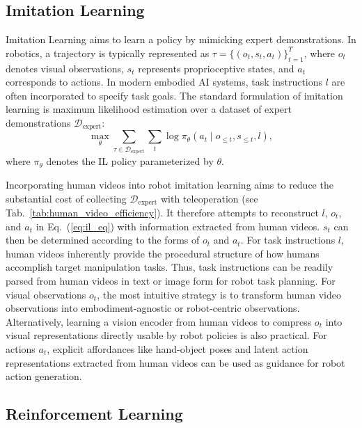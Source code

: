 \documentclass[Afour,sageh,times]{sagej}
\begin{document}
\subsection{Imitation Learning}

Imitation Learning aims to learn a policy by mimicking expert demonstrations. In robotics, a trajectory is typically represented as $\tau = \{(o_t, s_t, a_t)\}_{t=1}^T$, where $o_t$ denotes visual observations, $s_t$ represents proprioceptive states, and $a_t$ corresponds to actions. In modern embodied AI systems, task instructions $l$ are often incorporated to specify task goals. The standard formulation of imitation learning is maximum likelihood estimation over a dataset of expert demonstrations $\mathcal{D}_{\text{expert}}$:
\begin{equation}
\max_{\theta} \sum_{\tau \in \mathcal{D}_{\text{expert}}} \sum_{t} 
\log \pi_{\theta}(a_t \mid o_{\leq t}, s_{\leq t}, l),
\label{eq:il_eq}
\end{equation}
where $\pi_{\theta}$ denotes the IL policy parameterized by $\theta$.


Incorporating human videos into robot imitation learning aims to reduce the substantial cost of collecting $\mathcal{D}_{\text{expert}}$ with teleoperation (see Tab.~\ref{tab:human_video_efficiency}). It therefore attempts to reconstruct $l$, $o_t$, and $a_t$ in Eq.~(\ref{eq:il_eq}) with information extracted from human videos. $s_t$ can then be determined according to the forms of $o_t$ and $a_t$. For task instructions $l$, human videos inherently provide the procedural structure of how humans accomplish target manipulation tasks. Thus, task instructions can be readily parsed from human videos in text or image form for robot task planning. For visual observations $o_t$, the most intuitive strategy is to transform human video observations into embodiment-agnostic or robot-centric observations. Alternatively, learning a vision encoder from human videos to compress $o_t$ into visual representations directly usable by robot policies is also practical. For actions $a_t$, explicit affordances like hand-object poses and latent action representations extracted from human videos can be used as guidance for robot action generation.







\subsection{Reinforcement Learning}
\end{document}
